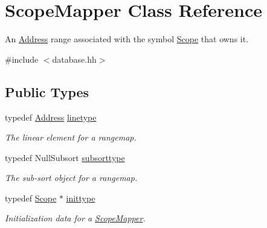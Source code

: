 \hypertarget{class_scope_mapper}{}\section{Scope\+Mapper Class Reference}
\label{class_scope_mapper}


An \mbox{\hyperlink{class_address}{Address}} range associated with the symbol \mbox{\hyperlink{class_scope}{Scope}} that owns it.  




{\ttfamily \#include $<$database.\+hh$>$}

\subsection*{Public Types}
\begin{DoxyCompactItemize}
\item 
typedef \mbox{\hyperlink{class_address}{Address}} \mbox{\hyperlink{class_scope_mapper_abdcc9189429d97c87bd108d85fcc14ea}{linetype}}
\begin{DoxyCompactList}\small\item\em The linear element for a rangemap. \end{DoxyCompactList}\item 
typedef Null\+Subsort \mbox{\hyperlink{class_scope_mapper_a598c78e0afbef2d73420af20d1045752}{subsorttype}}
\begin{DoxyCompactList}\small\item\em The sub-\/sort object for a rangemap. \end{DoxyCompactList}\item 
typedef \mbox{\hyperlink{class_scope}{Scope}} $\ast$ \mbox{\hyperlink{class_scope_mapper_a021edc02284840d933cb7a3217a292ad}{inittype}}
\begin{DoxyCompactList}\small\item\em Initialization data for a \mbox{\hyperlink{class_scope_mapper}{Scope\+Mapper}}. \end{DoxyCompactList}\end{DoxyCompactItemize}
